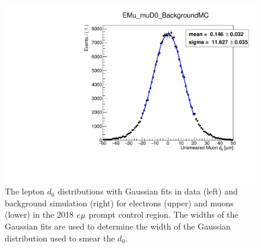 \begin{figure}[hbtp]
\includegraphics[scale=0.3]{figures/corrections/d0_smearing/emu_2018/gaussian_fit_EMu_muD0_BackgroundMC.pdf}
\caption{The lepton $d_0$ distributions with Gaussian fits in data (left) and background simulation (right) for electrons (upper) and muons (lower) in the 2018 $e{\mu}$ prompt control region. The widths of the Gaussian fits are used to determine the width of the Gaussian distribution used to smear the $d_0$.}
\label{gaussian_fits_2018}
\end{figure}